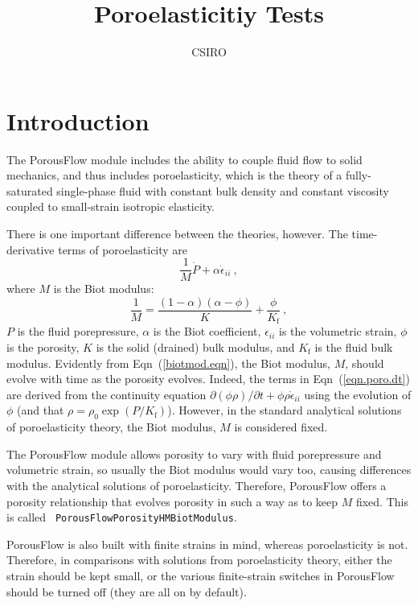 \documentclass[]{scrreprt}
\begin{document}
\title{Poroelasticitiy Tests}
\author{CSIRO}
\maketitle

\tableofcontents

\chapter{Introduction}

The PorousFlow module includes the ability to couple fluid flow to
solid mechanics, and thus includes poroelasticity, which is the theory
of a fully-saturated single-phase fluid with constant bulk density and
constant viscosity coupled to small-strain isotropic elasticity.

There is one important difference between the theories, however.  The
time-derivative terms of poroelasticity are
\begin{equation}
\frac{1}{M}\dot{P} + \alpha\dot{\epsilon}_{ii} \ ,
\label{eqn.poro.dt}
\end{equation}
where $M$ is the Biot modulus:
\begin{equation}
\frac{1}{M} = \frac{(1-\alpha)(\alpha - \phi)}{K} +
\frac{\phi}{K_{\mathrm{f}}} \ ,
\label{biotmod.eqn}
\end{equation}
$P$ is the fluid porepressure, $\alpha$ is the Biot coefficient,
$\epsilon_{ii}$ is the volumetric strain, $\phi$ is the porosity, $K$
is the solid (drained) bulk modulus, and $K_{\mathrm{f}}$ is the fluid
bulk modulus.  Evidently from Eqn~(\ref{biotmod.eqn}), the Biot
modulus, $M$, should evolve with time as the porosity evolves.
Indeed, the terms in Eqn~(\ref{eqn.poro.dt}) are derived from the
continuity equation $\partial (\phi\rho)/\partial t +
\phi\rho\dot{\epsilon}_{ii}$ using the evolution of $\phi$ (and that
$\rho = \rho_{0}\exp(P/K_{\mathrm{f}})$).  However, in the standard
analytical solutions of poroelasticity theory, the Biot modulus, $M$
is considered fixed.

The PorousFlow module allows porosity to vary with fluid porepressure
and volumetric strain, so usually the Biot modulus would vary too,
causing differences with the analytical solutions of poroelasticity.
Therefore, PorousFlow offers a porosity relationship that evolves
porosity in such a way as to keep $M$ fixed.  This is called {\tt
  PorousFlowPorosityHMBiotModulus}.

PorousFlow is also built with finite strains in mind, whereas
poroelasticity is not.  Therefore, in comparisons with solutions from
poroelasticity theory, either the strain should be kept small, or the
various finite-strain switches in PorousFlow should be turned off
(they are all on by default).
\end{document}

